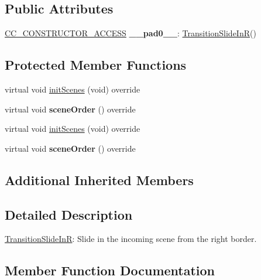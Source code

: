 \subsection*{Public Attributes}
\begin{DoxyCompactItemize}
\item 
\mbox{\label{classTransitionSlideInR_a2f81cfbc6974edad05a3efb6860c0939}} 
\hyperlink{_2cocos2d_2cocos_2base_2ccConfig_8h_a25ef1314f97c35a2ed3d029b0ead6da0}{C\+C\+\_\+\+C\+O\+N\+S\+T\+R\+U\+C\+T\+O\+R\+\_\+\+A\+C\+C\+E\+SS} {\bfseries \+\_\+\+\_\+pad0\+\_\+\+\_\+}\+: \hyperlink{classTransitionSlideInR}{Transition\+Slide\+InR}()
\end{DoxyCompactItemize}
\subsection*{Protected Member Functions}
\begin{DoxyCompactItemize}
\item 
virtual void \hyperlink{classTransitionSlideInR_a7fde5b3340ce2bd108d6382e0fd1a44f}{init\+Scenes} (void) override
\item 
\mbox{\label{classTransitionSlideInR_aec2963bba93fdac31378f31915a73d87}} 
virtual void {\bfseries scene\+Order} () override
\item 
virtual void \hyperlink{classTransitionSlideInR_a52d4ea6804532c5e6bc36400f6e907a6}{init\+Scenes} (void) override
\item 
\mbox{\label{classTransitionSlideInR_a6031ecfd4773ad5aa43f46e58ba823ee}} 
virtual void {\bfseries scene\+Order} () override
\end{DoxyCompactItemize}
\subsection*{Additional Inherited Members}


\subsection{Detailed Description}
\hyperlink{classTransitionSlideInR}{Transition\+Slide\+InR}\+: Slide in the incoming scene from the right border. 

\subsection{Member Function Documentation}
\mbox{\label{classTransitionSlideInR_a62161e5858110ef0122d98377f9a2cb7}} 
